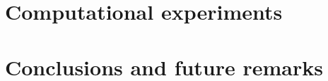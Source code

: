 \documentclass[conference, compsocconf]{IEEEtran}
\begin{document}


\section{Computational experiments}
\label{sec:exp}

\section{Conclusions and future remarks}
\label{sec:conc}

%



\end{document}
